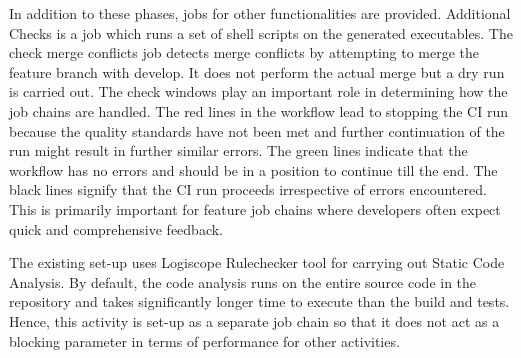 \documentclass[12pt, a4paper, titlepage]{scrartcl}
\begin{document}
\par In addition to these phases, jobs for other functionalities are provided. Additional Checks is a job which runs a set of shell scripts on the generated executables. The check merge conflicts job detects merge conflicts by attempting to merge the feature branch with develop. It does not perform the actual merge but a dry run is carried out. The check windows play an important role in determining how the job chains are handled. The red lines in the workflow lead to stopping the CI run because the quality standards have not been met and further continuation of the run might result in further similar errors. The green lines indicate that the workflow has no errors and should be in a position to continue till the end. The black lines signify that the CI run proceeds irrespective of errors encountered. This is primarily important for feature job chains where developers often expect quick and comprehensive feedback. 
\par The existing set-up uses Logiscope Rulechecker tool for carrying out Static Code Analysis. By default, the code analysis runs on the entire source code in the repository and takes significantly longer time to execute than the build and tests. Hence, this activity is set-up as a separate job chain so that it does not act as a blocking parameter in terms of performance for other activities. 
\end{document}
